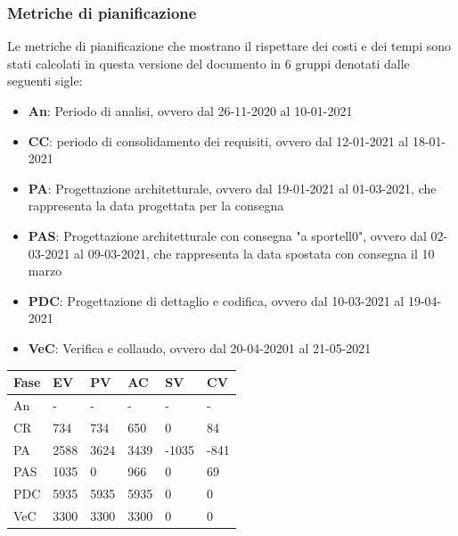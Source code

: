 \subsubsection{Metriche di pianificazione}
    Le metriche di pianificazione che mostrano il rispettare dei costi e dei tempi sono stati calcolati in questa versione del documento in 6 gruppi denotati dalle seguenti sigle:
    \begin{itemize}
        \item \textbf{An}: Periodo di analisi, ovvero dal 26-11-2020 al 10-01-2021
        \item \textbf{CC}: periodo di consolidamento dei requisiti, ovvero dal 12-01-2021 al 18-01-2021
        \item \textbf{PA}: Progettazione architetturale, ovvero dal 19-01-2021 al 01-03-2021, che rappresenta la data progettata per la consegna
        \item \textbf{PAS}: Progettazione architetturale con consegna "a sportell0", ovvero dal 02-03-2021 al 09-03-2021, che rappresenta la data spostata con consegna il 10 marzo
        \item \textbf{PDC}: Progettazione di dettaglio e codifica, ovvero dal 10-03-2021 al 19-04-2021
        \item \textbf{VeC}: Verifica e collaudo, ovvero dal 20-04-20201 al 21-05-2021
    \end{itemize}
    
    
    \begin{longtabu} to \textwidth {| X[0.1,c m] | X[0.1,c m]| X[0.1,c m]| X[0.1,c m]| X[0.1,c m]| X[0.1,c m] |}
        \hline
        \textbf{Fase} &
        \textbf{EV} &
        \textbf{PV} &
        \textbf{AC} &
        \textbf{SV} &
        \textbf{CV} \\
        \hline
        An & - & - & - & - & -  \\ 
        \hline
        CR & 734 & 734 & 650 & 0 & 84 \\
        \hline
        PA & 2588 & 3624 & 3439 & -1035 & -841\\
        \hline
        PAS & 1035 & 0 & 966 & 0 & 69 \\
        \hline
        PDC & 5935 & 5935 & 5935 & 0 & 0 \\
        \hline
        VeC & 3300 & 3300 & 3300 & 0 & 0 \\
        \hline 
        \end{longtabu}

